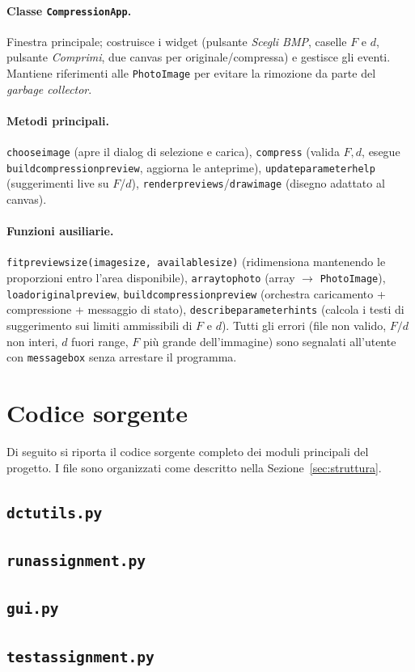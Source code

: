 \documentclass[11pt,a4paper]{article}
\makeatletter
\let\@origtexttt\texttt
\renewcommand{\texttt}[1]{{\def\_{\textunderscore\discretionary{}{}{}}\@origtexttt{#1}}}
\makeatother
\begin{document}
\paragraph{Classe \texttt{CompressionApp}.}
Finestra principale; costruisce i widget (pulsante \emph{Scegli BMP}, caselle
$F$ e $d$, pulsante \emph{Comprimi}, due canvas per originale/compressa) e gestisce
gli eventi. Mantiene riferimenti alle \texttt{PhotoImage} per evitare la
rimozione da parte del \emph{garbage collector}.

\paragraph{Metodi principali.}
\texttt{choose\_image} (apre il dialog di selezione e carica),
\texttt{compress} (valida $F,d$, esegue \texttt{build\_compression\_preview},
aggiorna le anteprime), \texttt{update\_parameter\_help} (suggerimenti live su
$F$/$d$), \texttt{render\_previews}/\texttt{draw\_image} (disegno adattato al
canvas).

\paragraph{Funzioni ausiliarie.}
\texttt{fit\_preview\_size(image\_size, available\_size)} (ridimensiona
mantenendo le proporzioni entro l'area disponibile),
\texttt{array\_to\_photo} (array $\to$ \texttt{PhotoImage}),
\texttt{load\_original\_preview}, \texttt{build\_compression\_preview}
(orchestra caricamento + compressione + messaggio di stato),
\texttt{describe\_parameter\_hints} (calcola i testi di suggerimento sui limiti
ammissibili di $F$ e $d$). Tutti gli errori (file non valido, $F/d$ non interi,
$d$ fuori range, $F$ più grande dell'immagine) sono segnalati all'utente con
\texttt{messagebox} senza arrestare il programma.


\appendix
\section{Codice sorgente}\label{app:codice}

Di seguito si riporta il codice sorgente completo dei moduli principali del
progetto. I file sono organizzati come descritto nella
Sezione~\ref{sec:struttura}.

\subsection{\texttt{dct\_utils.py}}


\subsection{\texttt{run\_assignment.py}}


\subsection{\texttt{gui.py}}


\subsection{\texttt{test\_assignment.py}}

\end{document}
